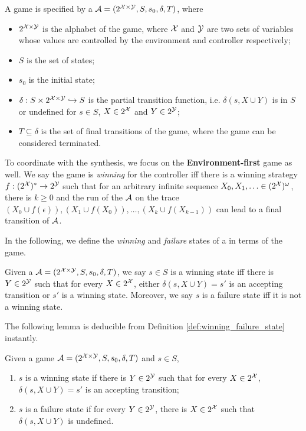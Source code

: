 \begin{definition}\label{tdfa-game}
	A \tdfa game is specified by a \tdfa $\mathcal{A} = (2^{\mathcal{X}\times\mathcal{Y}}, S, s_0, \delta, T)$, where 
	\begin{itemize}
		\item $2^{\mathcal{X}\times\mathcal{Y}}$ is the alphabet of the game, where $\mathcal{X}$ and $\mathcal{Y}$ are two sets of variables whose values are controlled by the environment and controller respectively;
		\item $S$ is the set of states;
		\item $s_0$ is the initial state;
		\item $\delta:S\times 2^{\mathcal{X}\times\mathcal{Y}}\hookrightarrow S$ is the partial transition function, i.e. $\delta (s, X\cup Y)$ is in $S$ or  undefined for $s\in S$, $X\in 2^{\mathcal{X}}$ and $Y\in 2^{\mathcal{Y}}$;
    \item $T \subseteq \delta$ is the set of final transitions of the game, where the game can be considered terminated.
	\end{itemize}
\end{definition}
To coordinate with the \ltlf synthesis, we focus on the \textbf{Environment-first} \tdfa game as well. We say the game is \emph{winning} for the controller iff there is a winning strategy $f: (2^{\mathcal{X}})^*\rightarrow 2^{\mathcal{Y}}$ such that for an arbitrary infinite sequence $X_0,X_1,\ldots\in (2^{\mathcal{X}})^{\omega}$, there is $k\geq 0$ and the run of the \tdfa $\mathcal{A}$ on the trace $(X_0\cup f(\epsilon)), (X_1\cup f(X_0)),\ldots, (X_k\cup f(X_{k-1}))$ can lead to a final transition of $\mathcal{A}$.

 In the following, we define the \emph{winning} and \emph{failure} states of a \tdfa in terms of the \tdfa game.

\begin{definition}\label{def:winning_failure_state}
\label{def:win_st}
Given a \tdfa $\mathcal{A} =(2^{\mathcal{X}\times \mathcal{Y}},S,s_0,\delta,T)$, we say $s\in S$ is a winning state iff there is $Y \in 2^{\mathcal{Y}}$ such that for every $X \in 2^{\mathcal{X}}$, either $\delta(s,X\cup Y)=s'$ is an accepting transition or $s'$ is a winning state. Moreover, we say $s$ is a failure state iff it is not a winning state.
\end{definition}

The following lemma is deducible from Definition \ref{def:winning_failure_state} instantly. 

\begin{lemma}
Given a \tdfa game $\mathcal{A} =(2^{\mathcal{X}\times \mathcal{Y}},S,s_0,\delta,T)$ and $s\in S$, 
\begin{enumerate}
	\item $s$ is a winning state if there is $Y \in 2^{\mathcal{Y}}$ such that for every $X \in 2^{\mathcal{X}}$, $\delta(s,X\cup Y)=s'$ is an accepting transition;
	\item $s$ is a failure state if for every $Y \in 2^{\mathcal{Y}}$, there is $X \in 2^{\mathcal{X}}$ such that $\delta(s,X \cup Y)$ is undefined.
\end{enumerate} 
\end{lemma}

